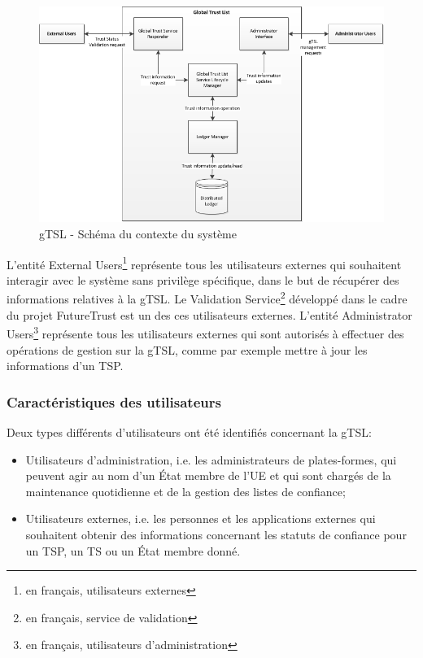 \documentclass{tnreport}
\begin{document}
\begin{figure}[h]
	\centering
	\includegraphics[scale=0.8]{figures/gTSL-SystemContextDiagram}
	\caption{gTSL - Schéma du contexte du système \cite{design-document}}
	\label{fig:system-context-diagram}
\end{figure}

L'entité External Users\footnote{en français, utilisateurs externes} représente tous les utilisateurs externes qui souhaitent interagir avec le système sans privilège spécifique, dans le but de récupérer des informations relatives à la gTSL. Le Validation Service\footnote{en français, service de validation} développé dans le cadre du projet FutureTrust est un des ces utilisateurs externes.
L'entité Administrator Users\footnote{en français, utilisateurs d'administration} représente tous les utilisateurs externes qui sont autorisés à effectuer des opérations de gestion sur la gTSL, comme par exemple mettre à jour les informations d'un TSP.

\subsubsection{Caractéristiques des utilisateurs}

Deux types différents d'utilisateurs ont été identifiés concernant la gTSL:
\begin{itemize}
	\item Utilisateurs d'administration, i.e. les administrateurs de plates-formes, qui peuvent agir au nom d'un État membre de l'UE et qui sont chargés de la maintenance quotidienne et de la gestion des listes de confiance;
	\item Utilisateurs externes, i.e. les personnes et les applications externes qui souhaitent obtenir des informations concernant les statuts de confiance pour un TSP, un TS ou un État membre donné.
\end{itemize}
\end{document}
